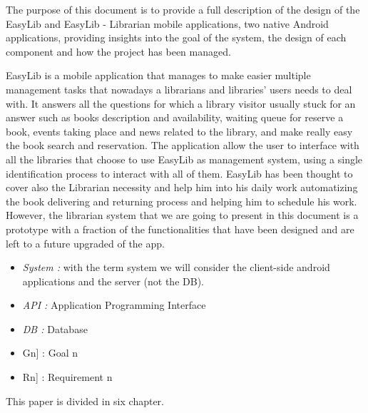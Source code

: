 \vspace*{-5mm}

The purpose of this document is to provide a full description of the design of the
EasyLib and EasyLib - Librarian mobile applications, two native Android applications, providing insights into the goal of the system, the design of each component and how the project has been managed.

EasyLib is a mobile application that manages to make easier multiple management tasks that nowadays a librarians and libraries' users needs to deal with. It answers all the questions for which a library visitor usually stuck for an answer such as books description and availability, waiting queue for reserve a book, events taking place and news related to the library, and make really easy the book search and reservation. The application allow the user to interface with all the libraries that choose to use EasyLib as management system, using a single identification process to interact with all of them.
EasyLib has been thought to cover also the Librarian necessity and help him into his daily work automatizing the book delivering and returning process and helping him to schedule his work. However, the librarian system that we are going to present in this document is a prototype with a fraction of the functionalities that have been designed and are left to a future upgraded of the app.


\begin{itemize}
	\item \emph{System :} with the term system we will consider the client-side android applications and the server (not the DB).
\end{itemize}

\begin{itemize}
	\setlength{\leftskip}{0.5cm}
	\item \emph{API :} Application Programming Interface
	\item \emph{DB :} Database
\end{itemize}

\begin{itemize}
	\setlength{\leftskip}{0.5cm}
	\item \lbrack Gn] : Goal n
	\item \lbrack Rn] : Requirement n
\end{itemize}

\newpage
{}
This paper is divided in six chapter.\\

